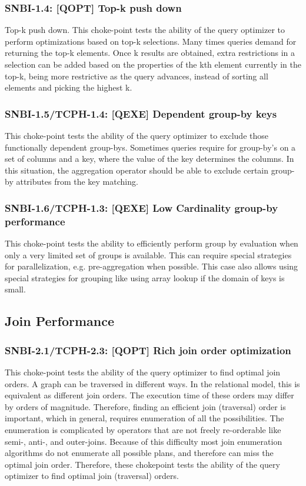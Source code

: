 \subsubsection{SNBI-1.4: [QOPT]  Top-k push down}
\label{choke_point_1.4}
Top-k push down. This choke-point tests the ability of the query optimizer to perform optimizations based on top-k selections. Many times queries demand for returning the top-k elements.
Once k results are obtained, extra restrictions in a selection can be added based on the properties of the kth element currently in the top-k, being more restrictive as the query advances, instead of sorting all elements and picking the highest k.

\subsubsection{SNBI-1.5/TCPH-1.4: [QEXE] Dependent group-by keys}
\label{choke_point_1.5}
This choke-point tests the ability of the query optimizer to exclude those functionally dependent group-bys. Sometimes queries require for group-by's on a set of columns and a key, where the value of the key determines the columns.
In this situation, the aggregation operator should be able to exclude certain group-by attributes from the key matching.

\subsubsection{SNBI-1.6/TCPH-1.3: [QEXE] Low Cardinality group-by performance}
\label{choke_point_1.6}
This choke-point tests the ability to efficiently perform group by evaluation when only a very limited set of groups is available.  This can require special strategies for parallelization, e.g. pre-aggregation when possible. This case also allows using special strategies for grouping like using array lookup if the domain of keys is small.

\subsection{Join Performance}

\subsubsection{SNBI-2.1/TCPH-2.3: [QOPT]  Rich join order optimization}
\label{choke_point_2.1}
This choke-point tests the ability of the query optimizer to find optimal join orders. A graph can be traversed in different ways. In the relational model, this is equivalent as different join orders.
The execution time of these orders may differ by orders of magnitude. Therefore, finding an efficient join (traversal) order is important, which in general, requires enumeration of all the possibilities.
The enumeration is complicated by operators that are not freely re-orderable like semi-, \mbox{anti-,} and outer-joins. Because of this difficulty most join enumeration algorithms do not enumerate all possible plans, and therefore can miss the optimal join order. Therefore, these chokepoint tests the ability of the query optimizer to find optimal join (traversal) orders.

